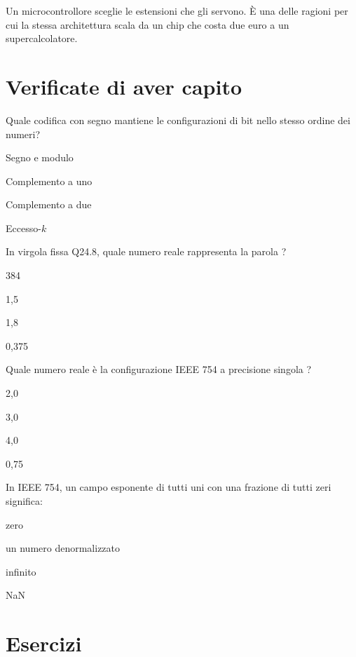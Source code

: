 Un microcontrollore sceglie le estensioni che gli servono. È una delle ragioni
per cui la stessa architettura scala da un chip che costa due euro a un
supercalcolatore.





\section{Verificate di aver capito}

\begin{quiz}{Quale codifica con segno mantiene le configurazioni di bit nello stesso ordine dei numeri?}
\item Segno e modulo
\item Complemento a uno
\item Complemento a due
\item Eccesso-$k$
\end{quiz}

\begin{quiz}{In virgola fissa Q24.8, quale numero reale rappresenta la parola ?}
\item 384
\item 1,5
\item 1,8
\item 0,375
\end{quiz}

\begin{quiz}{Quale numero reale è la configurazione IEEE 754 a precisione singola ?}
\item 2,0
\item 3,0
\item 4,0
\item 0,75
\end{quiz}

\begin{quiz}{In IEEE 754, un campo esponente di tutti uni con una frazione di tutti zeri significa:}
\item zero
\item un numero denormalizzato
\item infinito
\item NaN
\end{quiz}

\section{Esercizi}

